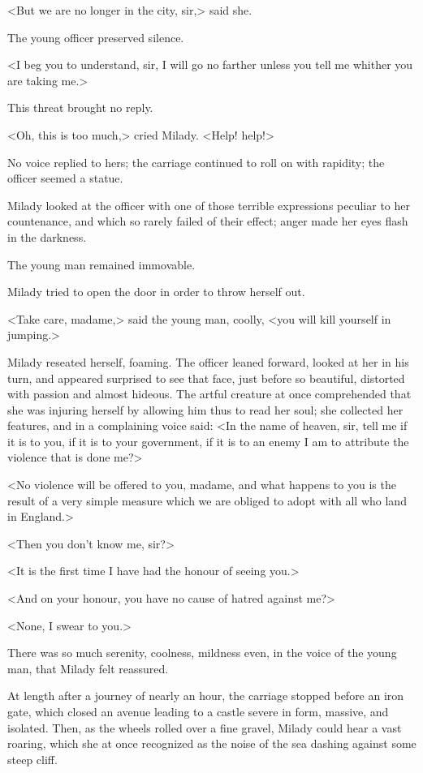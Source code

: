 <But we are no longer in the city, sir,> said she. 

The young officer preserved silence. 

<I beg you to understand, sir, I will go no farther unless you tell me whither you are taking me.> 

This threat brought no reply. 

<Oh, this is too much,> cried Milady. <Help! help!> 

No voice replied to hers; the carriage continued to roll on with rapidity; the officer seemed a statue. 

Milady looked at the officer with one of those terrible expressions peculiar to her countenance, and which so rarely failed of their effect; anger made her eyes flash in the darkness. 

The young man remained immovable. 

Milady tried to open the door in order to throw herself out. 

<Take care, madame,> said the young man, coolly, <you will kill yourself in jumping.> 

Milady reseated herself, foaming. The officer leaned forward, looked at her in his turn, and appeared surprised to see that face, just before so beautiful, distorted with passion and almost hideous. The artful creature at once comprehended that she was injuring herself by allowing him thus to read her soul; she collected her features, and in a complaining voice said: <In the name of heaven, sir, tell me if it is to you, if it is to your government, if it is to an enemy I am to attribute the violence that is done me?> 

<No violence will be offered to you, madame, and what happens to you is the result of a very simple measure which we are obliged to adopt with all who land in England.> 

<Then you don't know me, sir?> 

<It is the first time I have had the honour of seeing you.> 

<And on your honour, you have no cause of hatred against me?> 

<None, I swear to you.> 

There was so much serenity, coolness, mildness even, in the voice of the young man, that Milady felt reassured. 

At length after a journey of nearly an hour, the carriage stopped before an iron gate, which closed an avenue leading to a castle severe in form, massive, and isolated. Then, as the wheels rolled over a fine gravel, Milady could hear a vast roaring, which she at once recognized as the noise of the sea dashing against some steep cliff. 

